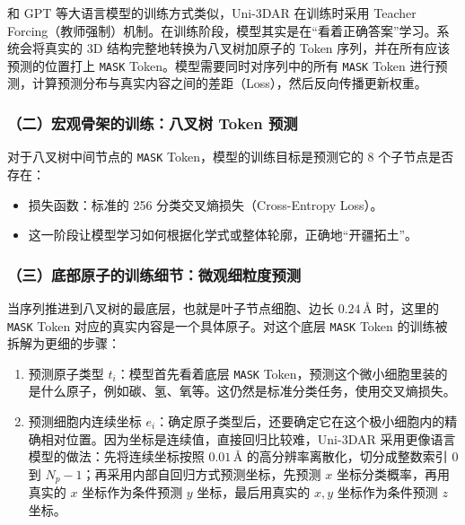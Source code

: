 和 GPT 等大语言模型的训练方式类似，Uni-3DAR 在训练时采用 Teacher Forcing（教师强制）机制。在训练阶段，模型其实是在``看着正确答案''学习。系统会将真实的 3D 结构完整地转换为八叉树加原子的 Token 序列，并在所有应该预测的位置打上 \texttt{MASK} Token。模型需要同时对序列中的所有 \texttt{MASK} Token 进行预测，计算预测分布与真实内容之间的差距（Loss），然后反向传播更新权重。

\hypertarget{ux4e8cux5b8fux89c2ux9aa8ux67b6ux7684ux8badux7ec3ux516bux53c9ux6811-token-ux9884ux6d4b}{%
\subsubsection{（二）宏观骨架的训练：八叉树 Token 预测}\label{ux4e8cux5b8fux89c2ux9aa8ux67b6ux7684ux8badux7ec3ux516bux53c9ux6811-token-ux9884ux6d4b}}

对于八叉树中间节点的 \texttt{MASK} Token，模型的训练目标是预测它的 8 个子节点是否存在：

\begin{itemize}
\tightlist
\item
  损失函数：标准的 256 分类交叉熵损失（Cross-Entropy Loss）。
\item
  这一阶段让模型学习如何根据化学式或整体轮廓，正确地``开疆拓土''。
\end{itemize}

\hypertarget{ux4e09ux5e95ux90e8ux539fux5b50ux7684ux8badux7ec3ux7ec6ux8282ux5faeux89c2ux7ec6ux7c92ux5ea6ux9884ux6d4b}{%
\subsubsection{（三）底部原子的训练细节：微观细粒度预测}\label{ux4e09ux5e95ux90e8ux539fux5b50ux7684ux8badux7ec3ux7ec6ux8282ux5faeux89c2ux7ec6ux7c92ux5ea6ux9884ux6d4b}}

当序列推进到八叉树的最底层，也就是叶子节点细胞、边长 \(0.24\,\text{\AA}\) 时，这里的 \texttt{MASK} Token 对应的真实内容是一个具体原子。对这个底层 \texttt{MASK} Token 的训练被拆解为更细的步骤：

\begin{enumerate}
\def\labelenumi{\arabic{enumi}.}
\tightlist
\item
  预测原子类型 \(t_i\)：模型首先看着底层 \texttt{MASK} Token，预测这个微小细胞里装的是什么原子，例如碳、氢、氧等。这仍然是标准分类任务，使用交叉熵损失。
\item
  预测细胞内连续坐标 \(e_i\)：确定原子类型后，还要确定它在这个极小细胞内的精确相对位置。因为坐标是连续值，直接回归比较难，Uni-3DAR 采用更像语言模型的做法：先将连续坐标按照 \(0.01\,\text{\AA}\) 的高分辨率离散化，切分成整数索引 \(0\) 到 \(N_p-1\)；再采用内部自回归方式预测坐标，先预测 \(x\) 坐标分类概率，再用真实的 \(x\) 坐标作为条件预测 \(y\) 坐标，最后用真实的 \(x,y\) 坐标作为条件预测 \(z\) 坐标。
\end{enumerate}

